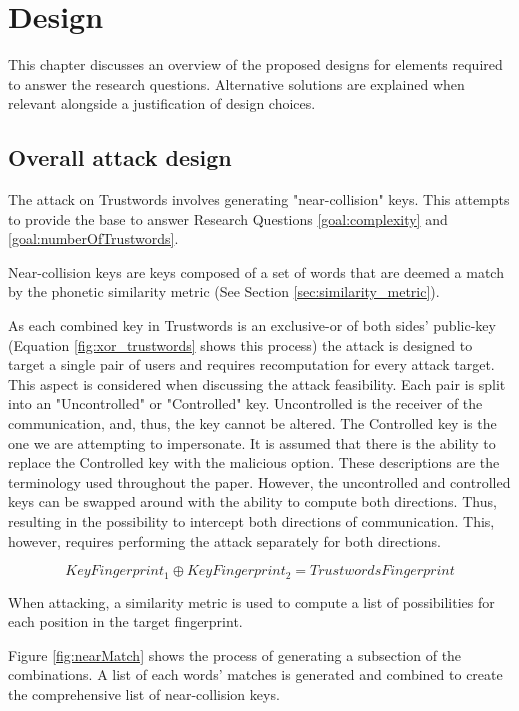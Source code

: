 \chapter{Design}
\label{cha:Design}

This chapter discusses an overview of the proposed designs for elements required to answer the research questions. Alternative solutions are explained when relevant alongside a justification of design choices.

\section{Overall attack design}
\label{sec:attackDesign}

The attack on Trustwords involves generating "near-collision" keys. 
This attempts to provide the base to answer Research Questions \ref{goal:complexity} and \ref{goal:numberOfTrustwords}.

Near-collision keys are keys composed of a set of words that are deemed a match by the phonetic similarity metric (See Section \ref{sec:similarity_metric}). 

As each combined key in Trustwords is an exclusive-or of both sides' public-key (Equation \ref{fig:xor_trustwords} shows this process) the attack is designed to target a single pair of users and requires recomputation for every attack target. This aspect is considered when discussing the attack feasibility. Each pair is split into an "Uncontrolled" or "Controlled" key. Uncontrolled is the receiver of the communication, and, thus, the key cannot be altered. The Controlled key is the one we are attempting to impersonate. It is assumed that there is the ability to replace the Controlled key with the malicious option. These descriptions are the terminology used throughout the paper. However, the uncontrolled and controlled keys can be swapped around with the ability to compute both directions. Thus, resulting in the possibility to intercept both directions of communication. This, however, requires performing the attack separately for both directions.

\begin{equation}
    KeyFingerprint_{1} \oplus KeyFingerprint_{2} = TrustwordsFingerprint
\end{equation}
\label{fig:xor_trustwords}

When attacking, a similarity metric is used to compute a list of possibilities for each position in the target fingerprint.

Figure \ref{fig:nearMatch} shows the process of generating a subsection of the combinations. A list of each words' matches is generated and combined to create the comprehensive list of near-collision keys.

